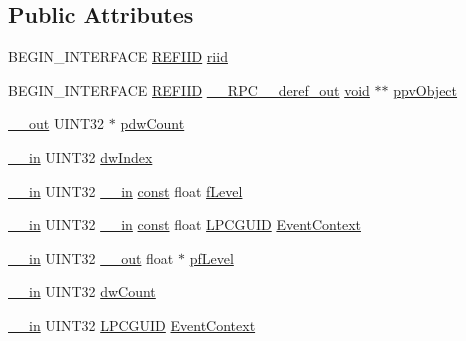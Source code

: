 \subsection*{Public Attributes}
\begin{DoxyCompactItemize}
\item 
B\+E\+G\+I\+N\+\_\+\+I\+N\+T\+E\+R\+F\+A\+CE \hyperlink{px__win__ds_8c_a80ec49c8ae61e234197d5071d2df497d}{R\+E\+F\+I\+ID} \hyperlink{struct_i_channel_audio_volume_vtbl_aa8529bbe5dd53fac0d214f5942833f72}{riid}
\item 
B\+E\+G\+I\+N\+\_\+\+I\+N\+T\+E\+R\+F\+A\+CE \hyperlink{px__win__ds_8c_a80ec49c8ae61e234197d5071d2df497d}{R\+E\+F\+I\+ID} \hyperlink{rpcsal_8h_a23bc188526f10656f9c79d950f6c3192}{\+\_\+\+\_\+\+R\+P\+C\+\_\+\+\_\+deref\+\_\+out} \hyperlink{sound_8c_ae35f5844602719cf66324f4de2a658b3}{void} $\ast$$\ast$ \hyperlink{struct_i_channel_audio_volume_vtbl_a7777be8bd394bfc3b7866128e63c17f0}{ppv\+Object}
\item 
\hyperlink{sal_8h_abb4c3c1135aab6c47cff22e7c16efb74}{\+\_\+\+\_\+out} U\+I\+N\+T32 $\ast$ \hyperlink{struct_i_channel_audio_volume_vtbl_a05e755546fa526a7a54c511276f52563}{pdw\+Count}
\item 
\hyperlink{sal_8h_a3f6b8655e1aa9dfc15a9029f0343009e}{\+\_\+\+\_\+in} U\+I\+N\+T32 \hyperlink{struct_i_channel_audio_volume_vtbl_a987733c39abb241d1e0b9428e9cb89b4}{dw\+Index}
\item 
\hyperlink{sal_8h_a3f6b8655e1aa9dfc15a9029f0343009e}{\+\_\+\+\_\+in} U\+I\+N\+T32 \hyperlink{sal_8h_a3f6b8655e1aa9dfc15a9029f0343009e}{\+\_\+\+\_\+in} \hyperlink{getopt1_8c_a2c212835823e3c54a8ab6d95c652660e}{const} float \hyperlink{struct_i_channel_audio_volume_vtbl_a7199b2fb0f1bbeceb2dfd964fcd3f081}{f\+Level}
\item 
\hyperlink{sal_8h_a3f6b8655e1aa9dfc15a9029f0343009e}{\+\_\+\+\_\+in} U\+I\+N\+T32 \hyperlink{sal_8h_a3f6b8655e1aa9dfc15a9029f0343009e}{\+\_\+\+\_\+in} \hyperlink{getopt1_8c_a2c212835823e3c54a8ab6d95c652660e}{const} float \hyperlink{pa__win__wasapi_8c_a9c061ab1f26db8746b3dab38991f48a0}{L\+P\+C\+G\+U\+ID} \hyperlink{struct_i_channel_audio_volume_vtbl_a0647d9cc251cffc408440c82883078fe}{Event\+Context}
\item 
\hyperlink{sal_8h_a3f6b8655e1aa9dfc15a9029f0343009e}{\+\_\+\+\_\+in} U\+I\+N\+T32 \hyperlink{sal_8h_abb4c3c1135aab6c47cff22e7c16efb74}{\+\_\+\+\_\+out} float $\ast$ \hyperlink{struct_i_channel_audio_volume_vtbl_a6eae61b232e1be061f0ab818cb2800d5}{pf\+Level}
\item 
\hyperlink{sal_8h_a3f6b8655e1aa9dfc15a9029f0343009e}{\+\_\+\+\_\+in} U\+I\+N\+T32 \hyperlink{struct_i_channel_audio_volume_vtbl_a6919d94fec4a1d2b47c8a1452748d745}{dw\+Count}
\item 
\hyperlink{sal_8h_a3f6b8655e1aa9dfc15a9029f0343009e}{\+\_\+\+\_\+in} U\+I\+N\+T32 \hyperlink{pa__win__wasapi_8c_a9c061ab1f26db8746b3dab38991f48a0}{L\+P\+C\+G\+U\+ID} \hyperlink{struct_i_channel_audio_volume_vtbl_af68dc0265aea3b154720692dee18934f}{Event\+Context}
\end{DoxyCompactItemize}


